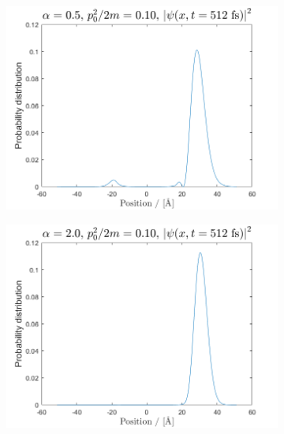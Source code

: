 \begin{figure}[H]
\begin{subfigure}[t]{0.47\textwidth}
	\includegraphics[width=\textwidth]{graphics/Task3/a1e2.png}
	\caption{}
	\label{fig:3_c}
\end{subfigure}
\begin{subfigure}[t]{0.47\textwidth}
	\includegraphics[width=\textwidth]{graphics/Task3/a2e2.png}
	\caption{}
	\label{fig:3_d}
\end{subfigure}


\end{figure}

